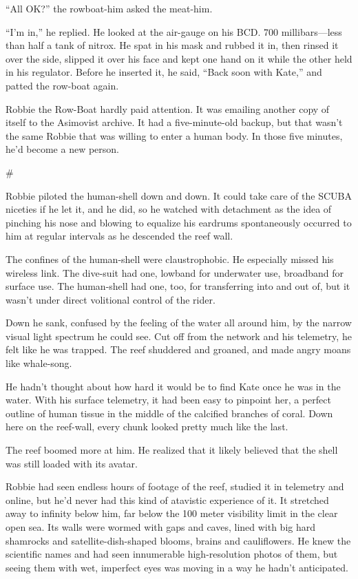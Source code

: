“All OK?” the rowboat-him asked the meat-him.

“I’m in,” he replied. He looked at the air-gauge on his BCD. 700
millibars—less than half a tank of nitrox. He spat in his mask and
rubbed it in, then rinsed it over the side, slipped it over his
face and kept one hand on it while the other held in his regulator.
Before he inserted it, he said, “Back soon with Kate,” and patted
the row-boat again.

Robbie the Row-Boat hardly paid attention. It was emailing another
copy of itself to the Asimovist archive. It had a five-minute-old
backup, but that wasn’t the same Robbie that was willing to enter a
human body. In those five minutes, he’d become a new person.

\#

Robbie piloted the human-shell down and down. It could take care of
the SCUBA niceties if he let it, and he did, so he watched with
detachment as the idea of pinching his nose and blowing to equalize
his eardrums spontaneously occurred to him at regular intervals as
he descended the reef wall.

The confines of the human-shell were claustrophobic. He especially
missed his wireless link. The dive-suit had one, lowband for
underwater use, broadband for surface use. The human-shell had one,
too, for transferring into and out of, but it wasn’t under direct
volitional control of the rider.

Down he sank, confused by the feeling of the water all around him,
by the narrow visual light spectrum he could see. Cut off from the
network and his telemetry, he felt like he was trapped. The reef
shuddered and groaned, and made angry moans like whale-song.

He hadn’t thought about how hard it would be to find Kate once he
was in the water. With his surface telemetry, it had been easy to
pinpoint her, a perfect outline of human tissue in the middle of
the calcified branches of coral. Down here on the reef-wall, every
chunk looked pretty much like the last.

The reef boomed more at him. He realized that it likely believed
that the shell was still loaded with its avatar.

Robbie had seen endless hours of footage of the reef, studied it in
telemetry and online, but he’d never had this kind of atavistic
experience of it. It stretched away to infinity below him, far
below the 100 meter visibility limit in the clear open sea. Its
walls were wormed with gaps and caves, lined with big hard
shamrocks and satellite-dish-shaped blooms, brains and
cauliflowers. He knew the scientific names and had seen innumerable
high-resolution photos of them, but seeing them with wet, imperfect
eyes was moving in a way he hadn’t anticipated.

